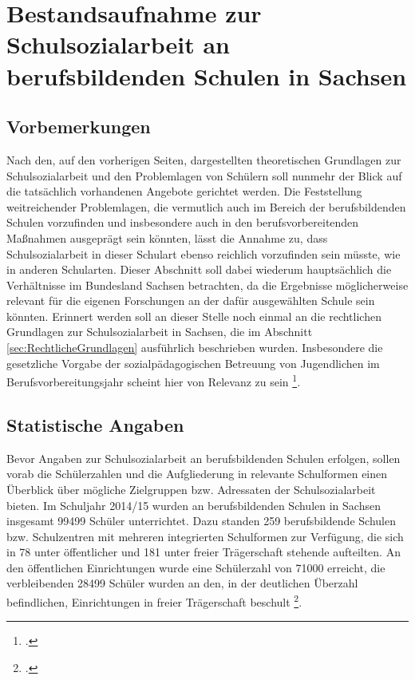 \section[Bestandsaufnahme zur Schulsozialarbeit]{Bestandsaufnahme zur Schulsozialarbeit an berufsbildenden Schulen in Sachsen}
\label{sec:BestandsaufnahmeZurSchulsozialarbeitAnBerufsbildendenSchulenInSachsen}

\subsection{Vorbemerkungen}
\label{sec:Vorbemerkungen}

Nach den, auf den vorherigen Seiten, dargestellten theoretischen Grundlagen zur Schulsozialarbeit und den Problemlagen von Schülern soll nunmehr der Blick auf die tatsächlich vorhandenen Angebote gerichtet werden. Die Feststellung weitreichender Problemlagen, die vermutlich auch im Bereich der berufsbildenden Schulen vorzufinden und insbesondere auch in den berufsvorbereitenden Maßnahmen ausgeprägt sein könnten, lässt die Annahme zu, dass Schulsozialarbeit in dieser Schulart ebenso reichlich vorzufinden sein müsste, wie in anderen Schularten. Dieser Abschnitt soll dabei wiederum hauptsächlich die Verhältnisse im Bundesland Sachsen betrachten, da die Ergebnisse möglicherweise relevant für die eigenen Forschungen an der dafür ausgewählten Schule sein könnten. Erinnert werden soll an dieser Stelle noch einmal an die rechtlichen Grundlagen zur Schulsozialarbeit in Sachsen, die im Abschnitt \ref{sec:RechtlicheGrundlagen} ausführlich beschrieben wurden. Insbesondere die gesetzliche Vorgabe der sozialpädagogischen Betreuung von Jugendlichen im Berufsvorbereitungsjahr scheint hier von Relevanz zu sein \footcite[vgl.][7]{SMKSK2010}.

\subsection{Statistische Angaben}
\label{sec:StatistischeAngaben}

Bevor Angaben zur Schulsozialarbeit an berufsbildenden Schulen erfolgen, sollen vorab die Schülerzahlen und die Aufgliederung in relevante Schulformen einen Überblick über mögliche Zielgruppen bzw. Adressaten der Schulsozialarbeit bieten. Im Schuljahr 2014/15 wurden an berufsbildenden Schulen in Sachsen insgesamt 99499 Schüler unterrichtet. Dazu standen 259 berufsbildende Schulen bzw. Schulzentren mit mehreren integrierten Schulformen zur Verfügung, die sich in 78 unter öffentlicher und 181 unter freier Trägerschaft stehende aufteilten. An den öffentlichen Einrichtungen wurde eine Schülerzahl von 71000 erreicht, die verbleibenden 28499 Schüler wurden an den, in der deutlichen Überzahl befindlichen, Einrichtungen in freier Trägerschaft beschult \footcite[vgl.][10ff]{SLFS2015}.

